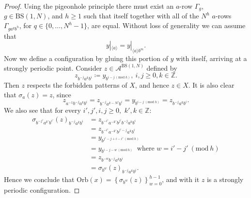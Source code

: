 \documentclass{aims}
\newcommand{\BS}[1][N]{\mathrm{BS}(1,#1)}
\theoremstyle{definition}
\begin{document}
\begin{proof}
	
	Using the pigeonhole principle there must exist an $a$-row $\Gamma_g$, $g\in \BS$, and $h\ge 1$ such that itself together with all of the $N^h$ $a$-rows $\Gamma_{ga^{q}b^h}$, for $q\in \{0,\ldots,N^h-1\}$, are equal. Without loss of generality we can assume that
	$$
	y|_{\langle a\rangle}=y|_{\langle a\rangle b^m}.
	$$
	Now we define a configuration by gluing this portion of $y$ with itself, arriving at a strongly periodic point. Consider $z\in \mathcal{A}^{\BS}$ defined by
	\begin{equation*}
	z_{b^{-j}a^kb^i}\coloneqq y_{b^{i-j \ (\mathrm{mod} \ h)} }, \ i,j\ge 0, k\in \mathbb{Z}.
	\end{equation*}
	Then $z$ respects the forbidden patterns of $X$, and hence $z\in X$. It is also clear that $\sigma_{a}(z)=z$, since
	$$
	z_{a^{-1}b^{-j}a^kb^i}=z_{b^{-j}a^{k-N^j}b^i}=y_{b^{i-j \ (\mathrm{mod} \ h)}}= z_{b^{-j}a^kb^i}.
	$$	
	We also see that for every $i',j',i,j\ge 0,$ $k',k\in \mathbb{Z}$:
	\begin{align*}
	\sigma_{b^{-j'}a^{k'}b^{i'}}(z)_{b^{-j}a^{k}b^i}&=z_{b^{-i'}a^{-k'}b^{j'}b^{-j}a^{k}b^i}\\
	&=z_{b^{-i'}a^{-k'}b^{j'-j}a^{k}b^i}\\
	&=y_{b^{j'-j+i-i'\ (\mathrm{mod} \ h)}}\\
	&=y_{b^{i-j-w\ (\mathrm{mod} \ h)}} \ \text{ where } w=i'-j'\ (\mathrm{mod} \ h)\\
	&=z_{b^{-w}b^ {-j}a^k b^i}\\
	&=\sigma_{b^w}(z)_{b^{-j}a^kb^i}.
	\end{align*}
	Hence we conclude that $\mathrm{Orb}(x)=\left\{ \sigma_{b^w}(z)\right\}_{w=0}^{h-1}$, and with it $z$ is a strongly periodic configuration.
\end{proof}
\end{document}

